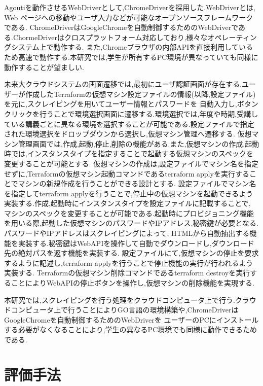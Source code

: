\documentclass[11pt]{ujarticle}\sloppy
\begin{document}
Agoutiを動作させるWebDriverとして,ChromeDriverを採用した.WebDriverとは, Web ページへの移動やユーザ入力などが可能なオープンソースフレームワークである.
ChromeDriverはGoogleChromeを自動制御するためのWebDriverである.ChormeDriverはクロスプラットフォーム対応しており,様々なオペレーティングシステム上で動作する.
また,Chromeブラウザの内部APIを直接利用しているため高速で動作する.本研究では,学生が所有するPC環境が異なっていても同様に動作することが望ましい.

未来大クラウドシステムの画面遷移では,最初にユーザ認証画面が存在する.ユーザーが作成したTerraformの仮想マシン設定ファイルの情報(以降,設定ファイル)を元に,スクレイピングを用いてユーザー情報とパスワードを
自動入力し,ボタンクリックを行うことで環境選択画面に遷移する.環境選択では,年度や時期,受講している講義ごとに異なる環境を選択することが可能である.設定ファイルで指定された環境選択をドロップダウンから選択し,仮想マシン管理へ遷移する.
仮想マシン管理画面では,作成,起動,停止,削除の機能がある.また,仮想マシンの作成,起動時では,インスタンスタイプを指定することで起動する仮想マシンのスペックを変更することが可能とする.
仮想マシンの作成は,設定ファイルでマシン名を指定せずに,Terraformの仮想マシン起動コマンドであるterraform applyを実行することでマシンの新規作成を行うことができる設計とする.
設定ファイルでマシン名を指定してterraform applyを行うことで,停止中の仮想マシンを起動できるよう実装する.作成,起動時にインスタンスタイプを設定ファイルに記載することで,
マシンのスペックを変更することが可能である.起動時にプロビジョニング機能を用いる際,起動した仮想マシンのパスワードやIPアドレス,秘密鍵が必要となる.パスワードやIPアドレスはスクレイピングによって,
HTMLから自動抽出する機能を実装する.秘密鍵はWebAPIを操作して自動でダウンロードし,ダウンロード先の絶対パスを返す機能を実装する.
設定ファイルにて,仮想マシンの停止を要求するように記述し,terraform applyを行うことで停止機能の実行が行われるよう実装する.
Terraformの仮想マシン削除コマンドであるterraform destroyを実行することによりWebAPIの停止ボタンを操作し,仮想マシンの削除機能を実現する.


本研究では,スクレイピングを行う処理をクラウドコンピュータ上で行う.クラウドコンピュータ上で行うことによりGO言語の環境構築や,ChromeDriverはGoogleChromeを自動制御するためのWebDriverを
ユーザーのPCにインストールする必要がなくなることにより,学生の異なるPC環境でも同様に動作できるためである.



\section{評価手法}
\end{document}
